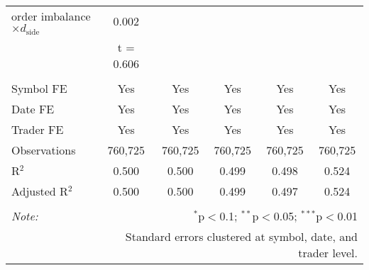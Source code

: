 \begin{table}[!htbp]
\begin{tabular}{@{\extracolsep{5pt}}lccccc}
  order imbalance $\times d_{\text{side}}$ & 0.002 &  &  &  &  \\ 
  & t = 0.606 &  &  &  &  \\ 
 \hline \\[-1.8ex] 
Symbol FE & Yes & Yes & Yes & Yes & Yes \\ 
Date FE & Yes & Yes & Yes & Yes & Yes \\ 
Trader FE & Yes & Yes & Yes & Yes & Yes \\ 
Observations & 760,725 & 760,725 & 760,725 & 760,725 & 760,725 \\ 
R$^{2}$ & 0.500 & 0.500 & 0.499 & 0.498 & 0.524 \\ 
Adjusted R$^{2}$ & 0.500 & 0.500 & 0.499 & 0.497 & 0.524 \\ 
\hline 
\hline \\[-1.8ex] 
\textit{Note:}  & \multicolumn{5}{r}{$^{*}$p$<$0.1; $^{**}$p$<$0.05; $^{***}$p$<$0.01} \\ 
 & \multicolumn{5}{r}{Standard errors clustered at symbol, date, and trader level.} \\ 
\end{tabular} 
\end{table} 
